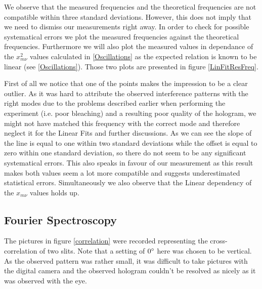 We observe that the measured frequencies and the theoretical frequencies are not compatible within three standard deviations. However, this does not imply that we need to dismiss our measurements right away. In order to check for possible systematical errors we plot the measured frequencies against the theoretical frequencies. Furthermore we will also plot the measured values in dependance of the $x_{m\nu}^2$ values calculated in \ref{Oscillations} as the expected relation is known to be linear (see \ref{Oscillations}). Those two plots are presented in figure \ref{LinFitResFreq}.


First of all we notice that one of the points makes the impression to be a clear outlier. As it was hard to attribute the observed interference patterns with the right modes due to the problems described earlier when performing the experiment (i.e. poor bleaching) and a resulting poor quality of the hologram, we might not have matched this frequency with the correct mode and therefore neglect it for the Linear Fits and further discussions.
As we can see the slope of the line is equal to one within two standard deviations while the offset is equal to zero within one standard deviation, so there do not seem to be any significant systematical errors. This also speaks in favour of our measurement as this result makes both values seem a lot more compatible and suggests underestimated statistical errors. Simultaneously we also observe that the Linear dependency of the $x_{m\nu}$ values holds up. 


\subsection{Fourier Spectroscopy}

The pictures in figure \ref{correlation} were recorded representing the cross-correlation of two slits. Note that a setting of $0^\circ$ here was chosen to be vertical. As the observed pattern was rather small, it was difficult to take pictures with the digital camera and the observed hologram couldn't be resolved as nicely as it was observed with the eye.


